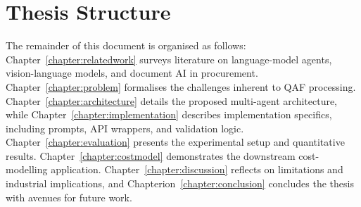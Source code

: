 \section{Thesis Structure }
The remainder of this document is organised as follows:  
Chapter~\ref{chapter:relatedwork} surveys literature on language-model agents, vision-language models, and document AI in procurement.  
Chapter~\ref{chapter:problem} formalises the challenges inherent to QAF processing.  
Chapter~\ref{chapter:architecture} details the proposed multi-agent architecture, while Chapter~\ref{chapter:implementation} describes implementation specifics, including prompts, API wrappers, and validation logic.  
Chapter~\ref{chapter:evaluation} presents the experimental setup and quantitative results.  
Chapter~\ref{chapter:costmodel} demonstrates the downstream cost-modelling application.  
Chapter~\ref{chapter:discussion} reflects on limitations and industrial implications, and Chapterion~\ref{chapter:conclusion} concludes the thesis with avenues for future work.
